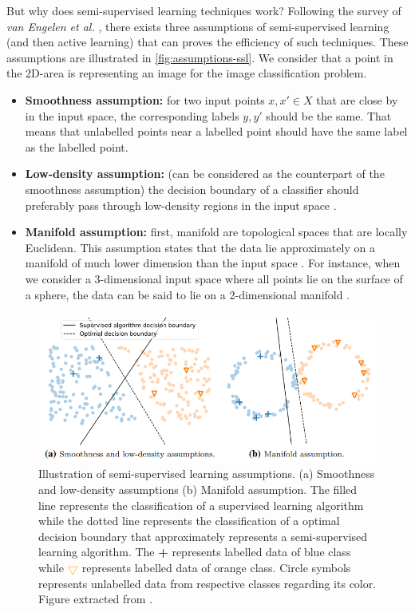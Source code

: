 \documentclass[11pt, openany]{report}
\theoremstyle{plain}
\theoremstyle{definition}
\theoremstyle{remark}
\begin{document}
But why does semi-supervised learning techniques work? Following the survey of \textit{van Engelen et al.} \cite{SSL-survey},  there exists three assumptions of semi-supervised learning (and then active learning) that can proves the efficiency of such techniques. These assumptions are illustrated in \autoref{fig:assumptions-ssl}. We consider that a point in the 2D-area is representing an image for the image classification problem. 

\begin{itemize}
\item \textbf{Smoothness assumption:} for two input points $x, x' \in X$ that are close by in
the input space, the corresponding labels $y, y'$ should be the same. \cite{SSL-survey} That means that unlabelled points near a labelled point should have the same label as the labelled point.    
\item \textbf{Low-density assumption:} (can be considered as the counterpart of the smoothness assumption) the decision boundary of a classifier should preferably pass through low-density regions in the input space \cite{SSL-survey}. 
\item \textbf{Manifold assumption:} first, manifold are topological spaces that are locally Euclidean. This assumption states that the data lie approximately on a manifold of much lower dimension than the input space \cite{wiki}.  For instance, when we consider a 3-dimensional input space where all points lie on the surface of a sphere, the data can be said to lie on a 2-dimensional manifold \cite{SSL-survey}. 
\end{itemize}

\begin{figure}[H]
  \centering
  \includegraphics[scale=0.7]{figures/ssl-assumptions.png}
  \caption{Illustration of semi-supervised learning assumptions. (a) Smoothness and low-density assumptions (b) Manifold assumption. The filled line represents the classification of a supervised learning algorithm while the dotted line represents the classification of a optimal decision boundary that approximately represents a semi-supervised learning algorithm. The \textbf{\textcolor{blue}{+}} represents labelled data of blue class while \textbf{\textcolor{orange}{$\bigtriangledown$}} represents labelled data of orange class. Circle symbols represents unlabelled data from respective classes regarding its color. Figure extracted from \cite{SSL-survey}.  }
  \label{fig:assumptions-ssl}
\end{figure} 
\end{document}
